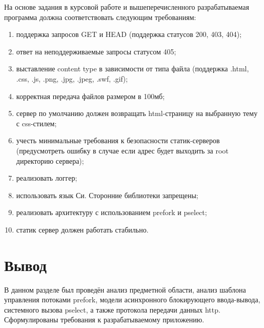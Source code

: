 На основе задания в курсовой работе и вышеперечисленного разрабатываемая программа должна соответствовать следующим требованиям:
\begin{enumerate}[label=\arabic*.]
	\item поддержка запросов GET и HEAD (поддержка статусов 200, 403, 404);
	\item ответ на неподдерживаемые запросы статусом 405;
	\item выставление content type в зависимости от типа файла (поддержка .html, .css, .js, .png, .jpg, .jpeg, .swf, .gif);
	\item корректная передача файлов размером в 100мб;
	\item сервер по умолчанию должен возвращать html-страницу на выбранную тему с css-стилем;
	\item учесть минимальные требования к безопасности статик-серверов (предусмотреть ошибку в случае если адрес будет выходить за root директорию сервера);
	\item реализовать логгер;
	\item использовать язык Си. Сторонние библиотеки запрещены;
	\item реализовать архитектуру с использованием prefork и pselect;
	\item статик сервер должен работать стабильно.
\end{enumerate}

\section*{Вывод}

В данном разделе был проведён анализ предметной области, анализ шаблона управления потоками prefork, модели асинхронного блокирующего ввода-вывода, системного вызова pselect, а также протокола передачи данных http. Сформулированы требования к разрабатываемому приложению.


